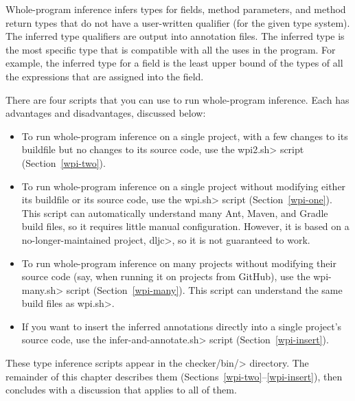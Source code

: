 
Whole-program inference
infers types for fields, method parameters, and method return types that do not
have a user-written qualifier (for the given type system).
The inferred type qualifiers are output into annotation files.
The inferred type is the most specific type that is compatible with all the
uses in the program.  For example, the inferred type for a field is the
least upper bound of the types of all the expressions that are assigned
into the field.

There are four scripts that you can use to run whole-program inference.
Each has advantages and disadvantages, discussed below:

\begin{itemize}
    \item
    To run whole-program inference on a single project, with a few changes to
    its buildfile but no changes to its source code, use the \<wpi2.sh> script
    (Section~\ref{wpi-two}).

    \item
    To run whole-program inference on a single project without modifying either its
    buildfile or its source code,
    use the \<wpi.sh> script (Section~\ref{wpi-one}). This script can automatically understand
    many Ant, Maven, and Gradle build files, so it requires little manual configuration.
    However, it is based on a no-longer-maintained project, \<dljc>, so it is not guaranteed to work.

    \item
    To run whole-program inference on many projects without modifying their source code
    (say, when running it on projects from GitHub), use the \<wpi-many.sh> script (Section~\ref{wpi-many}).
    This script can understand the same build files as \<wpi.sh>.

    \item
    If you want to insert the inferred annotations directly into a single
    project's source code, use the \<infer-and-annotate.sh> script (Section~\ref{wpi-insert}).
\end{itemize}

These type inference scripts appear in the \<checker/bin/> directory.
The remainder of this chapter describes them
(Sections~\ref{wpi-two}--\ref{wpi-insert}), then concludes with a discussion
that applies to all of them.



